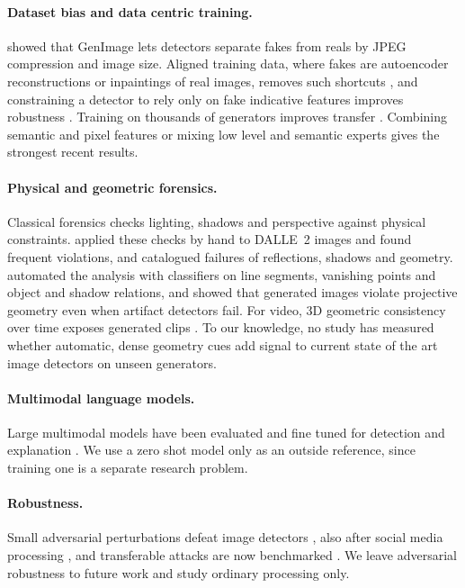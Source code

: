 \documentclass[11pt,a4paper]{article}
\begin{document}
\paragraph{Dataset bias and data centric training.} \citet{grommelt2024fake} showed that GenImage \citep{zhu2023genimage} lets detectors separate fakes from reals by JPEG compression and image size. Aligned training data, where fakes are autoencoder reconstructions or inpaintings of real images, removes such shortcuts \citep{rajan2025alignment,guillaro2025bfree,chen2025dda}, and constraining a detector to rely only on fake indicative features improves robustness \citep{rajan2025staypositive}. Training on thousands of generators improves transfer \citep{park2025community}. Combining semantic and pixel features \citep{cheng2025cospy} or mixing low level and semantic experts \citep{yan2025aide} gives the strongest recent results.

\paragraph{Physical and geometric forensics.} Classical forensics checks lighting, shadows and perspective against physical constraints. \citet{farid2022perspective,farid2022lighting} applied these checks by hand to DALL\textperiodcentered E~2 images and found frequent violations, and \citet{borji2023qualitative} catalogued failures of reflections, shadows and geometry. \citet{sarkar2024shadows} automated the analysis with classifiers on line segments, vanishing points and object and shadow relations, and showed that generated images violate projective geometry even when artifact detectors fail. For video, 3D geometric consistency over time exposes generated clips \citep{chen2025grab3d}. To our knowledge, no study has measured whether automatic, dense geometry cues add signal to current state of the art image detectors on unseen generators.

\paragraph{Multimodal language models.} Large multimodal models have been evaluated and fine tuned for detection and explanation \citep{jia2024chatgpt,ye2025loki,huang2025sida,wen2025fakevlm,kang2025legion,zhou2025holmes}. We use a zero shot model only as an outside reference, since training one is a separate research problem.

\paragraph{Robustness.} Small adversarial perturbations defeat image detectors \citep{carlini2020evading,saberi2024robustness}, also after social media processing \citep{mavali2024adversarial}, and transferable attacks are now benchmarked \citep{eddoubi2025raid}. We leave adversarial robustness to future work and study ordinary processing only.
\end{document}

